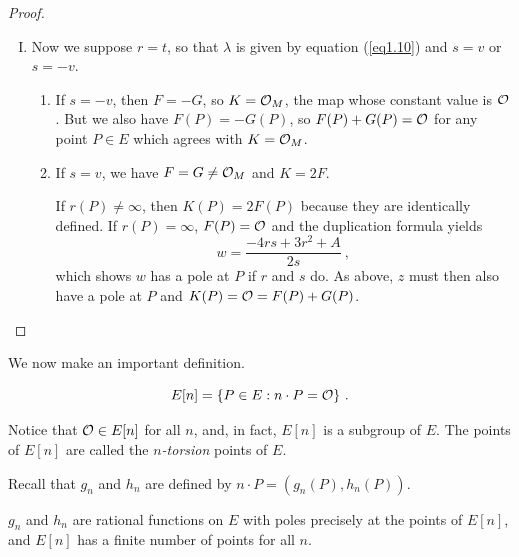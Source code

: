\begin{proof}
\begin{enumerate}[(I)]
\begin{enumerate}[(A)]
\end{enumerate}
\item
Now we suppose $r=t$, so that $\lambda$ is given by equation (\ref{eq1.10}) and $s=v$ or $s=-v$.
\begin{enumerate}
\item
If $s=-v$, then $F=-G$, so $K=\mathcal{O}_{M}$, the map whose constant value is $\mathcal{O}$. But we also have $F(P)=-G(P)$, so $F(P)+G(P)=\mathcal{O}$ for any point $P\in E$ which agrees with $K=\mathcal{O}_{M}$.
\item
If $s=v$, we have $F=G \neq \mathcal{O}_M$ and $K=2F$.

If $r(P) \neq \infty$, then $K(P) =2 F(P)$ because they are identically defined. If $r(P)=\infty$, $F(P)=\mathcal{O}$ and the duplication formula yields
$$w=\frac{-4rs+3r^{2}+A}{2s}\ ,$$
which shows $w$ has a pole at $P$ if $r$ and $s$ do. As above, $z$ must then also have a pole at $P$ and $K(P)=\mathcal{O}=F(P)+G(P)$.
\end{enumerate}
\end{enumerate}
\end{proof}

We now make an important definition.

\begin{defi}
\label{d7.2}
$$
E[n]=\{P\in E:n\cdot P=\mathcal{O}\}\ .
$$
\end{defi}

Notice that $\mathcal{O}\in E[n]$ for all $n$, and, in fact, $E[n]$ is a subgroup of $E$. The points of $E[n]$ are called the {\it $n$-torsion} points of $E$.

Recall that $g_{n}$ and $h_{n}$ are defined by $n\cdot P=(g_{n}(P),h_{n}(P))$.

\begin{theo}
\label{t7.3}
$g_{n}$ and $h_{n}$ are rational functions on $E$ with poles precisely at the points of $E[n]$, and $E[n]$ has a finite number of points for all $n$.
\end{theo}


